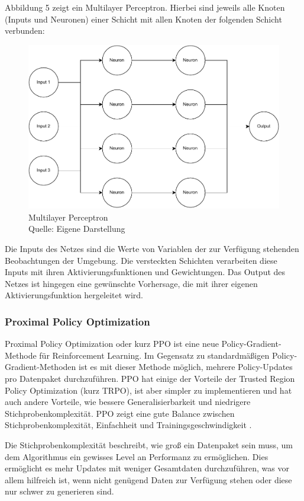 Abbildung 5 zeigt ein Multilayer Perceptron. Hierbei sind jeweils alle Knoten (Inputs und Neuronen) einer Schicht mit allen Knoten der folgenden Schicht verbunden:
\nopagebreak
\begin{figure}[H]
	\includegraphics[width=1\textwidth]{Bilder/mlp2.drawio} 
	\caption[Multilayer Perceptron]{Multilayer Perceptron\\ Quelle: Eigene Darstellung}
\end{figure}	

Die Inputs des Netzes sind die Werte von Variablen der zur Verfügung stehenden Beobachtungen der Umgebung. Die versteckten Schichten verarbeiten diese Inputs mit ihren Aktivierungsfunktionen und Gewichtungen. Das Output des Netzes ist hingegen eine gewünschte Vorhersage, die mit ihrer eigenen Aktivierungsfunktion hergeleitet wird.
\subsubsection{Proximal Policy Optimization}
Proximal Policy Optimization oder kurz PPO ist eine neue Policy-Gradient-Methode für Reinforcement Learning. Im Gegensatz zu standardmäßigen Policy-Gradient-Methoden ist es mit dieser Methode möglich, mehrere Policy-Updates pro Datenpaket durchzuführen. PPO hat einige der Vorteile der Trusted Region Policy Optimization (kurz TRPO), ist aber simpler zu implementieren und hat auch andere Vorteile, wie bessere Generalisierbarkeit und niedrigere Stichprobenkomplexität. PPO zeigt eine gute Balance zwischen Stichprobenkomplexität, Einfachheit und Trainingsgeschwindigkeit \cite[Seite 1]{schulman_proximal_2017}.

Die Stichprobenkomplexität beschreibt, wie groß ein Datenpaket sein muss, um dem Algorithmus ein gewisses Level an Performanz zu ermöglichen. Dies ermöglicht es mehr Updates mit weniger Gesamtdaten durchzuführen, was vor allem hilfreich ist, wenn nicht genügend Daten zur Verfügung stehen oder diese nur schwer zu generieren sind.

